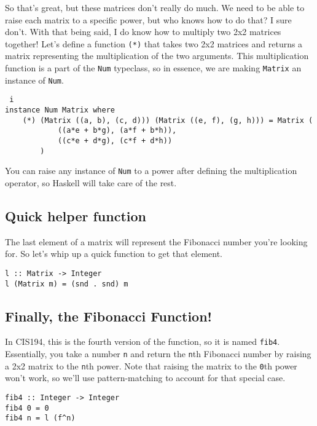 \documentclass[12pt]{article}
\begin{document}
	So that's great, but these matrices don't really do much. We need to be
	able to raise each matrix to a specific power, but who knows how to do
	that? I sure don't. With that being said, I do know how to multiply two
	2x2 matrices together! Let's define a function \texttt{(*)} that takes
	two 2x2 matrices and returns a matrix representing the multiplication of
	the two arguments. This multiplication function is a part of the
	\texttt{Num} typeclass, so in essence, we are making \texttt{Matrix} an
	instance of \texttt{Num}.

	\begin{lstlisting} i
instance Num Matrix where
	(*) (Matrix ((a, b), (c, d))) (Matrix ((e, f), (g, h))) = Matrix (
			((a*e + b*g), (a*f + b*h)), 
			((c*e + d*g), (c*f + d*h))
		) 
	\end{lstlisting}

	You can raise any instance of \texttt{Num} to a power after defining the
	multiplication operator, so Haskell will take care of the rest.

	\subsection{Quick helper function}\label{quick-helper-function}

	The last element of a matrix will represent the Fibonacci number you're
	looking for. So let's whip up a quick function to get that element.

	\begin{lstlisting} 
l :: Matrix -> Integer 
l (Matrix m) = (snd . snd) m 
	\end{lstlisting}

	\subsection{Finally, the Fibonacci
	Function!}\label{finally-the-fibonacci-function}

	In CIS194, this is the fourth version of the function, so it is named
	\texttt{fib4}. Essentially, you take a number \texttt{n} and return the
	\texttt{n}th Fibonacci number by raising a 2x2 matrix to the
	\texttt{n}th power. Note that raising the matrix to the \texttt{0}th
	power won't work, so we'll use pattern-matching to account for that
	special case.

	\begin{lstlisting} 
fib4 :: Integer -> Integer 
fib4 0 = 0 
fib4 n = l (f^n) 
	\end{lstlisting}
\end{document}
